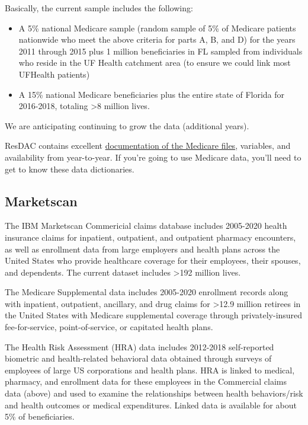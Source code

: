 \documentclass[
  letterpaper,
  DIV=11,
  numbers=noendperiod]{scrreprt}
\providecommand{\tightlist}{%
  \setlength{\itemsep}{0pt}\setlength{\parskip}{0pt}}\usepackage{longtable,booktabs,array}
\begin{document}
Basically, the current sample includes the following:

\begin{itemize}
\tightlist
\item
  A 5\% national Medicare sample (random sample of 5\% of Medicare
  patients nationwide who meet the above criteria for parts A, B, and D)
  for the years 2011 through 2015 plus 1 million beneficiaries in FL
  sampled from individuals who reside in the UF Health catchment area
  (to ensure we could link most UFHealth patients)
\item
  A 15\% national Medicare beneficiaries plus the entire state of
  Florida for 2016-2018, totaling \textgreater8 million lives.
\end{itemize}

We are anticipating continuing to grow the data (additional years).

ResDAC contains excellent
\href{https://resdac.org/file-availability}{documentation of the
Medicare files}, variables, and availability from year-to-year. If
you're going to use Medicare data, you'll need to get to know these data
dictionaries.

\hypertarget{marketscan}{%
\subsection{Marketscan}\label{marketscan}}

The IBM Marketscan Commericial claims database includes 2005-2020 health
insurance claims for inpatient, outpatient, and outpatient pharmacy
encounters, as well as enrollment data from large employers and health
plans across the United States who provide healthcare coverage for their
employees, their spouses, and dependents. The current dataset includes
\textgreater192 million lives.

The Medicare Supplemental data includes 2005-2020 enrollment records
along with inpatient, outpatient, ancillary, and drug claims for
\textgreater12.9 million retirees in the United States with Medicare
supplemental coverage through privately-insured fee-for-service,
point-of-service, or capitated health plans.

The Health Risk Assessment (HRA) data includes 2012-2018 self-reported
biometric and health-related behavioral data obtained through surveys of
employees of large US corporations and health plans. HRA is linked to
medical, pharmacy, and enrollment data for these employees in the
Commercial claims data (above) and used to examine the relationships
between health behaviors/risk and health outcomes or medical
expenditures. Linked data is available for about 5\% of beneficiaries.
\end{document}
